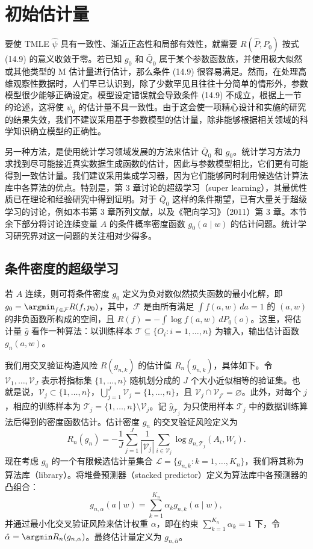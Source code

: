 \section{初始估计量}

要使 TMLE $\hat\psi$ 具有一致性、渐近正态性和局部有效性，就需要 $R(\hat P,P_0)$ 按式 (14.9) 的意义收敛于零。若已知 $g_0$ 和 $\bar Q_0$ 属于某个参数函数族，并使用极大似然或其他类型的 M 估计量进行估计，那么条件 (14.9) 很容易满足。然而，在处理高维观察性数据时，人们早已认识到，除了少数罕见且往往十分简单的情形外，参数模型很少能够正确设定。模型设定错误就会导致条件 (14.9) 不成立，根据上一节的论述，这将使 $\psi_0$ 的估计量不具一致性。由于这会使一项精心设计和实施的研究的结果失效，我们不建议采用基于参数模型的估计量，除非能够根据相关领域的科学知识确立模型的正确性。

另一种方法，是使用统计学习领域发展的方法来估计 $\bar Q_0$ 和 $g_0$。统计学习方法力求找到尽可能接近真实数据生成函数的估计，因此与参数模型相比，它们更有可能得到一致估计量。我们建议采用集成学习器，因为它们能够同时利用候选估计算法库中各算法的优点。特别是，第 3 章讨论的超级学习（super learning），其最优性质已在理论和经验研究中得到证明。对于 $\bar Q_0$ 这样的条件期望，已有大量关于超级学习的讨论，例如本书第 3 章所列文献，以及《靶向学习》（2011）第 3 章。本节余下部分将讨论连续变量 $A$ 的条件概率密度函数 $g_0(a\mid w)$ 的估计问题。统计学习研究界对这一问题的关注相对少得多。

\subsection{条件密度的超级学习}

若 $A$ 连续，则可将条件密度 $g_0$ 定义为负对数似然损失函数的最小化解，即 $g_0=\argmin_{f\in\mathcal F}R(f,p_0)$，其中，$\mathcal F$ 是由所有满足 $\int f(a,w)\,da=1$ 的 $(a,w)$ 的非负函数所构成的空间，且 $R(f)=-\int\log f(a,w)\,dP_0(o)$。这里，将估计量 $\hat g$ 看作一种算法：以训练样本 $\mathcal T\subseteq\{O_i:i=1,\ldots,n\}$ 为输入，输出估计函数 $g_n(a,w)$。

我们用交叉验证构造风险 $R(g_{n,k})$ 的估计值 $R_n(g_{n,k})$，具体如下。令 $\mathcal V_1,\ldots,\mathcal V_J$ 表示将指标集 $\{1,\ldots,n\}$ 随机划分成的 $J$ 个大小近似相等的验证集。也就是说，$\mathcal V_j\subset\{1,\ldots,n\}$，$\bigcup_{j=1}^J\mathcal V_j=\{1,\ldots,n\}$，且 $\mathcal V_j\cap\mathcal V_{j'}=\varnothing$。此外，对每个 $j$，相应的训练样本为 $\mathcal T_j=\{1,\ldots,n\}\setminus\mathcal V_j$。记 $\hat g_{\mathcal T_j}$ 为只使用样本 $\mathcal T_j$ 中的数据训练算法后得到的密度函数估计。估计密度 $g_n$ 的交叉验证风险定义为
\begin{equation}
 R_n(g_n)=-\frac1J\sum_{j=1}^J\frac1{|\mathcal V_j|}
 \sum_{i\in\mathcal V_j}\log g_{n,\mathcal T_j}(A_i,W_i).
 \tag{14.10}
\end{equation}
现在考虑 $g_0$ 的一个有限候选估计量集合 $\mathcal L=\{g_{n,k}:k=1,\ldots,K_n\}$，我们将其称为算法库（library）。将堆叠预测器（stacked predictor）定义为算法库中各预测器的凸组合：
\[
 g_{n,\alpha}(a\mid w)=\sum_{k=1}^{K_n}\alpha_k g_{n,k}(a\mid w),
\]
并通过最小化交叉验证风险来估计权重 $\alpha$，即在约束 $\sum_{k=1}^{K_n}\alpha_k=1$ 下，令 $\hat\alpha=\argmin R_n(g_{n,\alpha})$。最终估计量定义为 $g_{n,\hat\alpha}$。

